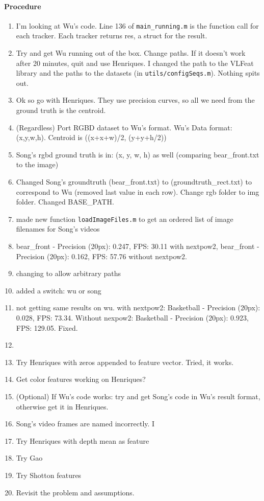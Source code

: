 \paragraph{Procedure}  
\begin{enumerate}
    \item I'm looking at Wu's code. Line 136 of 
    \texttt{main\_running.m}
    is the function call for each tracker. Each tracker returns res, a struct for the result. 
	\item Try and get Wu running out of the box. Change paths. If it doesn't work after 20 minutes, quit and use Henriques. I changed the path to the VLFeat library and the paths to the datasets (in \texttt{utils/configSeqs.m}). Nothing spits out.
	\item Ok so go with Henriques. They use precision curves, so all we need from the ground truth is the centroid.
	\item (Regardless) Port RGBD dataset to Wu's format. Wu's Data format: (x,y,w,h). Centroid is ((x+x+w)/2, (y+y+h/2))
	\item Song's rgbd ground truth is in: (x, y, w, h) as well (comparing  bear\_front.txt to the image)
	\item Changed Song's groundtruth (bear\_front.txt) to (groundtruth\_rect.txt) to correspond to Wu (removed last value in each row). Change rgb folder to img folder. Changed BASE\_PATH. 
	\item made new function \texttt{loadImageFiles.m} to get an ordered list of image filenames for Song's videos
	\item   bear\_front - Precision (20px): 0.247, FPS: 30.11 with nextpow2,   bear\_front - Precision (20px): 0.162, FPS: 57.76 without nextpow2.
    \item changing to allow arbitrary paths
    \item added a switch: wu or song
    \item not getting same results on wu.  with nextpow2: Basketball - Precision (20px): 0.028, FPS: 73.34. Without nexpow2: Basketball - Precision (20px): 0.923, FPS: 129.05. Fixed.
    \item 

	\item Try Henriques with zeros appended to feature vector. Tried, it works.
	          \item Get color features working on Henriques?
	\item (Optional) If Wu's code works: try and get Song's code in Wu's result format, otherwise get it in Henriques.
	\item Song's video frames are named incorrectly. I
    \item Try Henriques with depth mean as feature
    \item Try Gao
    \item Try Shotton features
    \item Revisit the problem and assumptions.

\end{enumerate}


